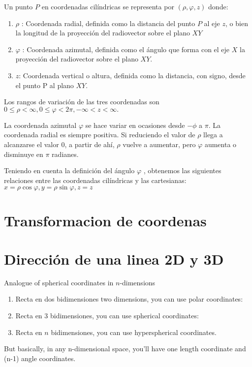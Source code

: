Un punto $P$ en coordenadas cilíndricas se representa por $(\rho ,\varphi ,z)$ donde:
\begin{enumerate}
  \item $\rho$ : Coordenada radial, definida como la distancia del punto $P$ al eje $z$, o bien la longitud de la proyección del radiovector sobre el plano $XY$
   \item  $\varphi$ : Coordenada azimutal, definida como el ángulo que forma con el eje $X$ la proyección del radiovector sobre el plano $XY$.
   \item  $z$: Coordenada vertical o altura, definida como la distancia, con signo, desde el punto P al plano $XY$.

\end{enumerate}
Los rangos de variación de las tres coordenadas son $0\leq \rho <\infty, 0\leq \varphi <2\pi, -\infty <z<\infty.$

La coordenada azimutal $\varphi$  se hace variar en ocasiones desde $-\phi$ a $\pi$. La coordenada radial es siempre positiva. Si reduciendo el valor de $\rho$  llega a alcanzarse el valor 0, a partir de ahí, $\rho$  vuelve a aumentar, pero $\varphi$  aumenta o disminuye en $\pi$ radianes.

Teniendo en cuenta la definición del ángulo $\varphi$ , obtenemos las siguientes relaciones entre las coordenadas cilíndricas y las cartesianas: $x=\rho \cos \varphi , y=\rho \sin \varphi ,z=z$


\section{Transformacion de coordenas}

\section{Dirección de una linea 2D y 3D}


Analogue of spherical coordinates in $n$-dimensions

\begin{enumerate}
\item Recta en dos bidimensiones two dimensions, you can use polar coordinates:
\item Recta en 3 bidimensiones, you can use spherical coordinates:
\item Recta en $n$ bidimensiones, you can use hyperspherical coordinates.
\end{enumerate}

But basically, in any n-dimensional space, you'll have one length coordinate and (n-1) angle coordinates.

